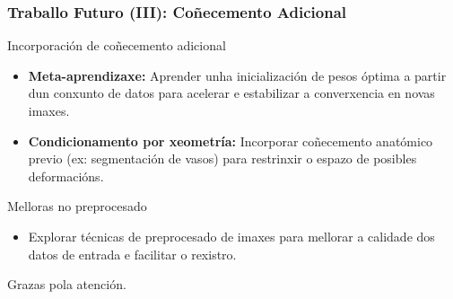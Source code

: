 \documentclass[xcolor=dvipsnames]{beamer}
\begin{document}
\begin{frame}
    \frametitle{Traballo Futuro (III): Coñecemento Adicional}

    \begin{block}{Incorporación de coñecemento adicional}
        \begin{itemize}
            \item \textbf{Meta-aprendizaxe:} Aprender unha inicialización de pesos óptima a partir dun conxunto de datos para acelerar e estabilizar a converxencia en novas imaxes.
            \item \textbf{Condicionamento por xeometría:} Incorporar coñecemento anatómico previo (ex: segmentación de vasos) para restrinxir o espazo de posibles deformacións.
        \end{itemize}
    \end{block}
    \begin{block}{Melloras no preprocesado}
        \begin{itemize}
            \item Explorar técnicas de preprocesado de imaxes para mellorar a calidade dos datos de entrada e facilitar o rexistro.
        \end{itemize}
    \end{block}
\end{frame}


\begin{frame}
    \centering
    \Huge
    Grazas pola atención.
    \vspace{1cm}
\end{frame}

\begin{frame}
    \titlepage
\end{frame}
\end{document}
